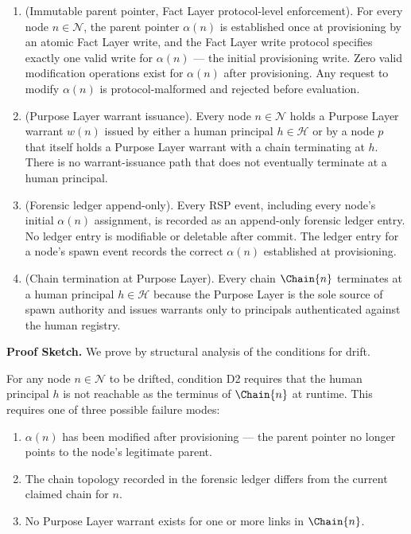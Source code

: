 \begin{enumerate}
\item[$\textbf{I}_1$] (Immutable parent pointer, Fact Layer protocol-level enforcement). For every node $n \in \mathcal{N}$, the parent pointer $\alpha(n)$ is established once at provisioning by an atomic Fact Layer write, and the Fact Layer write protocol specifies exactly one valid write for $\alpha(n)$ — the initial provisioning write. Zero valid modification operations exist for $\alpha(n)$ after provisioning. Any request to modify $\alpha(n)$ is protocol-malformed and rejected before evaluation.

\item[$\textbf{I}_2$] (Purpose Layer warrant issuance). Every node $n \in \mathcal{N}$ holds a Purpose Layer warrant $w(n)$ issued by either a human principal $h \in \mathcal{H}$ or by a node $p$ that itself holds a Purpose Layer warrant with a chain terminating at $h$. There is no warrant-issuance path that does not eventually terminate at a human principal.

\item[$\textbf{I}_3$] (Forensic ledger append-only). Every RSP event, including every node's initial $\alpha(n)$ assignment, is recorded as an append-only forensic ledger entry. No ledger entry is modifiable or deletable after commit. The ledger entry for a node's spawn event records the correct $\alpha(n)$ established at provisioning.

\item[$\textbf{I}_4$] (Chain termination at Purpose Layer). Every chain $\Chain{n}$ terminates at a human principal $h \in \mathcal{H}$ because the Purpose Layer is the sole source of spawn authority and issues warrants only to principals authenticated against the human registry.
\end{enumerate}

\bigskip
\noindent\textbf{Proof Sketch.} We prove by structural analysis of the conditions for drift.

For any node $n \in \mathcal{N}$ to be drifted, condition D2 requires that the human principal $h$ is not reachable as the terminus of $\Chain{n}$ at runtime. This requires one of three possible failure modes:

\begin{enumerate}
\item[(F1)] $\alpha(n)$ has been modified after provisioning — the parent pointer no longer points to the node's legitimate parent.
\item[(F2)] The chain topology recorded in the forensic ledger differs from the current claimed chain for $n$.
\item[(F3)] No Purpose Layer warrant exists for one or more links in $\Chain{n}$.
\end{enumerate}

